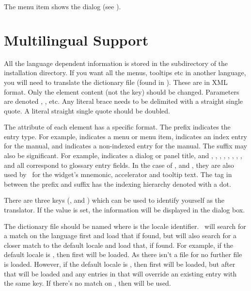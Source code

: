 The  menu item shows the 
dialog (see ).



\chapter{Multilingual Support}\label{sec:multilingualsupport}

All the language dependent information is stored in the
 subdirectory of the installation directory.
If you want all the menus, tooltips
etc in another language, you will need to translate the
dictionary file (found in ). 
These are in XML format. Only the element content (not the key)
should be changed. Parameters are denoted ,
, etc. Any literal brace needs to be delimited with
a straight single quote. A literal straight single quote should be
doubled.

The  attribute of each  element has a specific
format. The prefix indicates the entry type. For example,
 indicates a menu or menu item,  indicates an
index entry for the manual, and  indicates a
non-indexed entry for the manual.  The suffix may also be
significant. For example,  indicates a dialog or panel
title, and , , ,
, , , ,
, and  all correspond to glossary
entry fields. In the case of ,  and
, they are also used by \FlowframTk\ for the widget's
mnemonic, accelerator and tooltip text.  The tag in between the
prefix and suffix has the indexing hierarchy denoted with a dot.

There are three keys (,
 and )
which can be used to identify yourself as the translator. If
the  value is set, the information will be
displayed in the  dialog box.

The dictionary file should be named
where  is the locale identifier.
\FlowframTk\ will search for a match on the language first
and load that if found, but will also search for a closer match to
the default locale and load that, if found. For example,
if the default locale is , then first
 will be loaded. As there isn't a file
for  no further file is loaded.
However, if the default locale is , then first
 will be loaded, but after that
 will be loaded and any entries in
that will override an existing entry with the same key.
If there's no match on , then 
 will be used.

